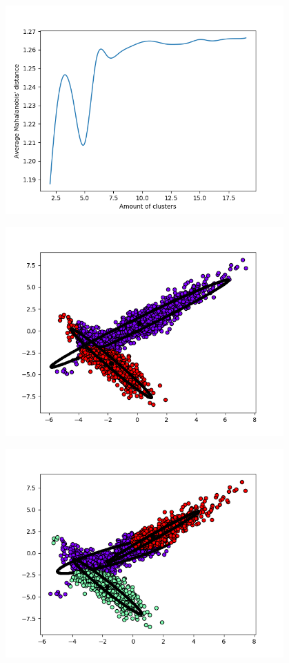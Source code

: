 \includegraphics[height=8cm]{./plots/avrg_distance_for_k.png}

\includegraphics[height=8cm]{./plots/plot_for_k_2.png}

\includegraphics[height=8cm]{./plots/plot_for_k_3.png}

